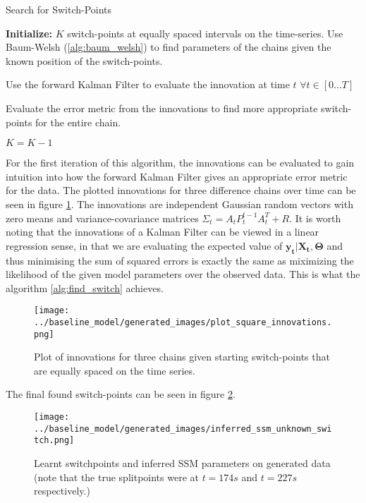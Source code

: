 \documentclass{article}
\begin{document}
\begin{algorithm}
\caption{Search for Switch-Points}\label{alg:find_switch}

  \begin{algorithmic}
  \STATE \textbf{Initialize:}  $K$ switch-points at equally spaced intervals on the time-series.
    \STATE Use Baum-Welsh (\ref{alg:baum_welsh}) to find parameters of the chains given the known position of the switch-points.

    \STATE Use the forward Kalman Filter to evaluate the innovation at time $t$ $\forall t \in [0 \hdots T]$

    \STATE Evaluate the error metric from the innovations to find more appropriate switch-points for the entire chain.

      \STATE $K = K - 1$
    \ENDIF
    \ENDWHILE
  \end{algorithmic}
\end{algorithm}

For the first iteration of this algorithm, the innovations can be evaluated to gain intuition into how the forward Kalman Filter gives an appropriate error metric for the data. The plotted innovations for three difference chains over time can be seen in figure \ref{fig:plot_square_innovations}. The innovations are independent Gaussian random vectors with zero means and variance-covariance matrices $\Sigma_t = A_tP^{t-1}_{t}A_t^T + R$. It is worth noting that the innovations of a Kalman Filter can be viewed in a linear regression sense, in that we are evaluating the expected value of $\mathbf{y_t | X_t, \Theta}$ and thus minimising the sum of squared errors is exactly the same as miximizing the likelihood of the given model parameters over the observed data. This is what the algorithm \ref{alg:find_switch} achieves.

\begin{figure}[h]
\center
\texttt{[image: ../baseline\_model/generated\_images/plot\_square\_innovations.png]}
\caption{Plot of innovations for three chains given starting switch-points that are equally spaced on the time series.}\label{fig:plot_square_innovations}
\end{figure}

The final found switch-points can be seen in figure \ref{fig:inferred_ssm_unknown_switch}.

\begin{figure}
\center
\texttt{[image: ../baseline\_model/generated\_images/inferred\_ssm\_unknown\_switch.png]}
\caption{Learnt switchpoints and inferred SSM parameters on generated data (note that the true splitpoints were at $t=174s$ and $t=227s$ respectively.)}\label{fig:inferred_ssm_unknown_switch}
\end{figure}
\end{document}
